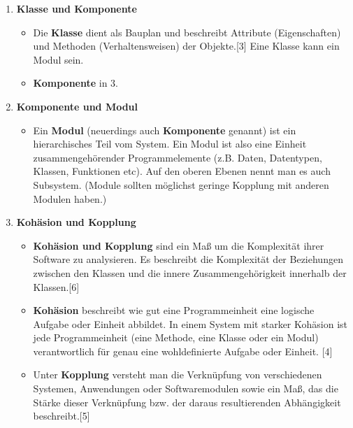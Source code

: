 \begin{enumerate}[(a)]
\begin{enumerate}[1.]
        \item \textbf{Klasse und Komponente}
        \begin{itemize}
            \item Die \textbf{Klasse} dient als Bauplan und beschreibt Attribute (Eigenschaften) und Methoden (Verhaltensweisen) der Objekte.[3] Eine Klasse kann ein Modul sein.
            \item \textbf{Komponente} in 3.
        \end{itemize}
        
        \item \textbf{Komponente und Modul}
        \begin{itemize}
            \item Ein \textbf{Modul} (neuerdings auch \textbf{Komponente} genannt) ist ein hierarchisches Teil vom System. Ein Modul ist also eine Einheit zusammengehörender Programmelemente (z.B. Daten, Datentypen, Klassen, Funktionen etc). Auf den oberen Ebenen nennt man es auch Subsystem. (Module sollten möglichst geringe Kopplung mit anderen Modulen haben.)
        \end{itemize}
        
        \item \textbf{Kohäsion und Kopplung}
        \begin{itemize}
            \item \textbf{Kohäsion und Kopplung} sind ein Maß um die Komplexität ihrer Software zu analysieren. Es beschreibt die Komplexität der Beziehungen zwischen den Klassen und die innere Zusammengehörigkeit innerhalb der Klassen.[6]
            \item \textbf{Kohäsion} beschreibt wie gut eine Programmeinheit eine logische Aufgabe oder Einheit abbildet. In einem System mit starker Kohäsion ist jede Programmeinheit (eine Methode, eine Klasse oder ein Modul) verantwortlich für genau eine wohldefinierte Aufgabe oder Einheit. [4]
            \item Unter \textbf{Kopplung} versteht man die Verknüpfung von verschiedenen Systemen, Anwendungen oder Softwaremodulen sowie ein Maß, das die Stärke dieser Verknüpfung bzw. der daraus resultierenden Abhängigkeit beschreibt.[5]
        \end{itemize}
    \end{enumerate}
  

\end{enumerate}
